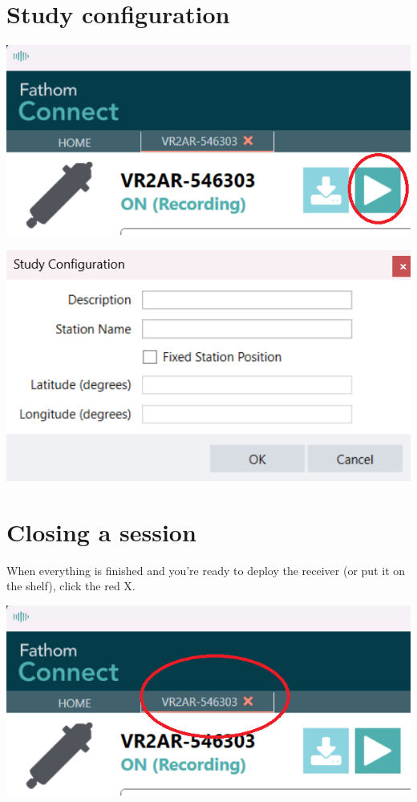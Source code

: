 \documentclass[
  letterpaper,
  DIV=11,
  numbers=noendperiod]{scrreprt}
\begin{document}
\section{Study configuration}\label{study-configuration}

\includegraphics{images/fathom/buttons_config.png}

\includegraphics{images/fathom/study_config.png}

\section{Closing a session}\label{closing-a-session}

When everything is finished and you're ready to deploy the receiver (or
put it on the shelf), click the red X.

\includegraphics{images/fathom/buttons_exit.png}
\end{document}
